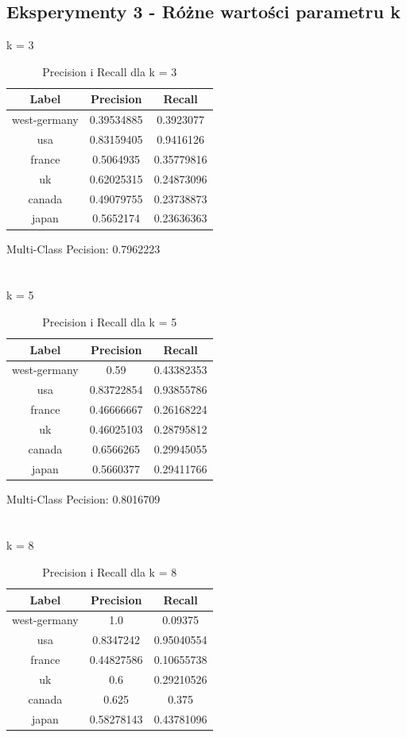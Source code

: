\documentclass{classrep}
\begin{document}
\subsection{Eksperymenty 3 - Różne wartości parametru k}
k = 3
\begin{table}[H]
\begin{tabular}{|c|c|c|}
\hline
Label        & Precision  & Recall     \\ \hline
west-germany & 0.39534885 & 0.3923077  \\ \hline
usa          & 0.83159405 & 0.9416126  \\ \hline
france       & 0.5064935  & 0.35779816 \\ \hline
uk           & 0.62025315 & 0.24873096 \\ \hline
canada       & 0.49079755 & 0.23738873 \\ \hline
japan        & 0.5652174  & 0.23636363 \\ \hline
\end{tabular}
\caption{Precision i Recall dla k = 3}
\end{table}
Multi-Class Pecision: 0.7962223\\
\\
\\
k = 5
\begin{table}[H]
\begin{tabular}{|c|c|c|}
\hline
Label        & Precision  & Recall     \\ \hline
west-germany & 0.59       & 0.43382353 \\ \hline
usa          & 0.83722854 & 0.93855786 \\ \hline
france       & 0.46666667 & 0.26168224 \\ \hline
uk           & 0.46025103 & 0.28795812 \\ \hline
canada       & 0.6566265  & 0.29945055 \\ \hline
japan        & 0.5660377  & 0.29411766 \\ \hline
\end{tabular}
\caption{Precision i Recall dla k = 5}
\end{table}
Multi-Class Pecision: 0.8016709\\
\\
\\
k = 8
\begin{table}[H]
\begin{tabular}{|c|c|c|}
\hline
Label        & Precision  & Recall     \\ \hline
west-germany & 1.0        & 0.09375    \\ \hline
usa          & 0.8347242  & 0.95040554 \\ \hline
france       & 0.44827586 & 0.10655738 \\ \hline
uk           & 0.6        & 0.29210526 \\ \hline
canada       & 0.625      & 0.375      \\ \hline
japan        & 0.58278143 & 0.43781096 \\ \hline
\end{tabular}
\caption{Precision i Recall dla k = 8}
\end{table}
\end{document}
